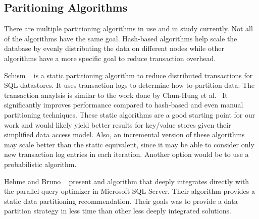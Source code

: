 \subsection{Paritioning Algorithms}
There are multiple partitioning algorithms in use and in study currently.  Not all of the algorithms have the same goal.  Hash-based algorithms help scale the database by evenly distributing the data on different nodes while other algorithms have a more specific goal to reduce transaction overhead.

Schism ~\cite{Curino:2010:SWA:1920841.1920853} is a static partitioning algorithm to reduce distributed transactions for SQL datastores. It uses transaction logs to determine how to partition data. The transaction anaylsis is similar to the work done by Chun-Hung et al.~\cite{chun:2002} It significantly improves performance compared to hash-based and even manual partitioning techniques. These static algorithms are a good starting point for our work and would likely yield better results for key/value stores given their simplified data access model. Also, an incremental version of these algorithms may scale better than the static equivalent, since it may be able to consider only new transaction log entries in each iteration. Another option would be to use a probabilistic algorithm.

Hehme and Bruno ~\cite{Nehme:2011:APD:1989323.1989444} present and algorithm that deeply integrates directly with the parallel query optimizer in Microsoft SQL Server.  Their algorithm provides a static data partitioning recommendation.  Their goals was to provide a data partition strategy in less time than other less deeply integrated solutions.
